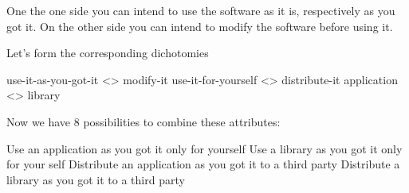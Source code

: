 One the one side you can intend to use the software as it is, respectively as
you got it. On the other side you can intend to modify the software before using
it.

Let's form the corresponding dichotomies

use-it-as-you-got-it <> modify-it
use-it-for-yourself <> distribute-it
application <> library

Now we have 8 possibilities to combine these attributes:

Use an application as you got it only for yourself
Use a library as you got it only for your self
Distribute an application as you got it to a third party
Distribute a library as you got it to a third party




%
